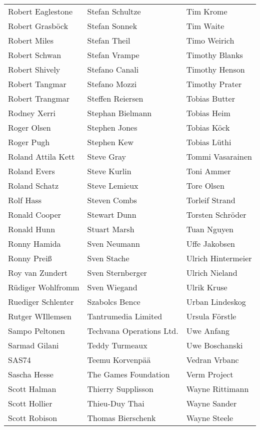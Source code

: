 \begin{small}
\begin{tabular}{p{4cm}p{4cm}p{4cm}}
Robert Eaglestone & Stefan Schultze & Tim Krome \\
Robert Grasböck & Stefan Sonnek & Tim Waite \\
Robert Miles & Stefan Theil & Timo Weirich \\
Robert Schwan & Stefan Vrampe & Timothy Blanks \\
Robert Shively & Stefano Canali & Timothy Henson \\
Robert Tangmar & Stefano Mozzi & Timothy Prater \\
Robert Trangmar & Steffen Reiersen & Tobias Butter \\
Rodney Xerri & Stephan Bielmann & Tobias Heim \\
Roger Olsen & Stephen Jones & Tobias Köck \\
Roger Pugh & Stephen Kew & Tobias Lüthi \\
Roland Attila Kett & Steve Gray & Tommi Vasarainen \\
Roland Evers & Steve Kurlin & Toni Ammer \\
Roland Schatz & Steve Lemieux & Tore Olsen \\
Rolf Hass & Steven Combs & Torleif Strand \\
Ronald Cooper & Stewart Dunn & Torsten Schröder \\
Ronald Hunn & Stuart Marsh & Tuan Nguyen \\
Ronny Hamida & Sven Neumann & Uffe Jakobsen \\
Ronny Preiß & Sven Stache & Ulrich Hintermeier \\
Roy van Zundert & Sven Sternberger & Ulrich Nieland \\
Rüdiger Wohlfromm & Sven Wiegand & Ulrik Kruse \\
Ruediger Schlenter & Szabolcs Bence & Urban Lindeskog \\
Rutger WIllemsen & Tantrumedia Limited & Ursula Förstle \\
Sampo Peltonen & Techvana Operations Ltd. & Uwe Anfang \\
Sarmad Gilani & Teddy Turmeaux & Uwe Boschanski \\
SAS74 & Teemu Korvenpää & Vedran Vrbanc \\
Sascha Hesse & The Games Foundation & Verm Project \\
Scott Halman & Thierry Supplisson & Wayne Rittimann \\
Scott Hollier & Thieu-Duy Thai & Wayne Sander \\
Scott Robison & Thomas Bierschenk & Wayne Steele \\

\end{tabular}
\end{small}

